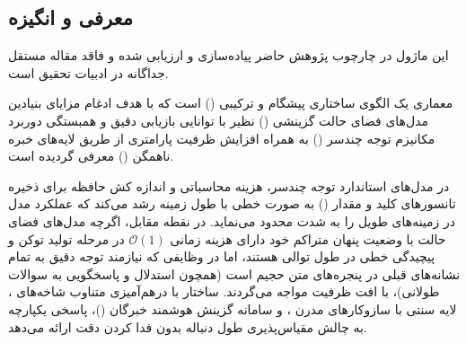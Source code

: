 \subsection{معرفی و انگیزه}
این ماژول در چارچوب پژوهش حاضر پیاده‌سازی و ارزیابی شده و فاقد مقاله مستقل جداگانه در ادبیات تحقیق است.

معماری  یک الگوی ساختاری پیشگام و ترکیبی () است که با هدف ادغام مزایای بنیادین مدل‌های فضای حالت گزینشی () نظیر  با توانایی بازیابی دقیق و همبستگی دوربرد مکانیزم توجه چندسر () به همراه افزایش ظرفیت پارامتری از طریق لایه‌های خبره ناهمگن () معرفی گردیده است. 

در مدل‌های استاندارد توجه چندسر، هزینه محاسباتی و اندازه کش حافظه برای ذخیره تانسورهای کلید و مقدار () به صورت خطی با طول زمینه رشد می‌کند که عملکرد مدل در زمینه‌های طویل را به شدت محدود می‌نماید. در نقطه مقابل، اگرچه مدل‌های فضای حالت با وضعیت پنهان متراکم خود دارای هزینه زمانی $\mathcal{O}(1)$ در مرحله تولید توکن و پیچیدگی خطی در طول توالی هستند، اما در وظایفی که نیازمند توجه دقیق به تمام نشانه‌های قبلی در پنجره‌های متن حجیم است (همچون استدلال و پاسخگویی به سوالات طولانی)، با افت ظرفیت مواجه می‌گردند. ساختار  با درهم‌آمیزی متناوب شاخه‌های ، لایه سنتی  با سازوکارهای مدرن ، و سامانه گزینش هوشمند خبرگان ()، پاسخی یکپارچه به چالش مقیاس‌پذیری طول دنباله بدون فدا کردن دقت ارائه می‌دهد.
